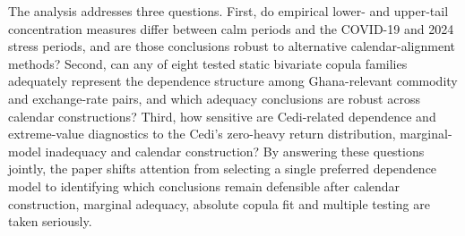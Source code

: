 The analysis addresses three questions. First, do empirical lower- and upper-tail concentration measures differ between calm periods and the COVID-19 and 2024 stress periods, and are those conclusions robust to alternative calendar-alignment methods? Second, can any of eight tested static bivariate copula families adequately represent the dependence structure among Ghana-relevant commodity and exchange-rate pairs, and which adequacy conclusions are robust across calendar constructions? Third, how sensitive are Cedi-related dependence and extreme-value diagnostics to the Cedi's zero-heavy return distribution, marginal-model inadequacy and calendar construction? By answering these questions jointly, the paper shifts attention from selecting a single preferred dependence model to identifying which conclusions remain defensible after calendar construction, marginal adequacy, absolute copula fit and multiple testing are taken seriously.
